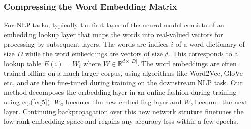 \subsubsection{Compressing the Word Embedding Matrix }
For NLP tasks, typically the first layer of the neural model consists of an
embedding lookup layer that maps the words into real-valued vectors for
processing by subsequent layers. The words are indices $i$ of a word dictionary
of size $D$ while the word embeddings are vectors of size $d$. This corresponds
to a lookup table $E(i) = W_i$ where $W \in \mathbb{R}^{d \times |D|}$. The word
embeddings are often trained offline on a much larger corpus, using algorithms
like Word2Vec, GloVe etc, and are then fine-tuned during training on the downstream NLP task.  Our method 
decomposes the embedding layer in an online fashion during training using eq.(\ref{eq5}).
$W_a$ becomes the new embedding layer and $W_b$ becomes the next layer. Continuing backpropagation over this new network struture finetunes the low rank embedding space and regains any accuracy loss within a few epochs.
